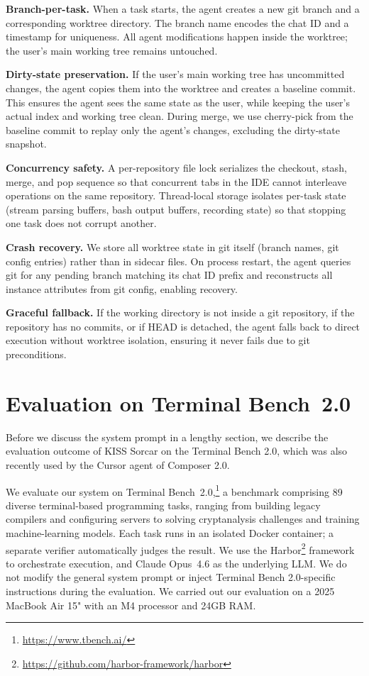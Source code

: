 \documentclass{article}
\begin{document}
\textbf{Branch-per-task.}  When a task starts, the agent creates a new git branch and a corresponding worktree directory.  The branch name encodes the chat ID and a timestamp for uniqueness.  All agent modifications happen inside the worktree; the user's main working tree remains untouched.

\textbf{Dirty-state preservation.}  If the user's main working tree has uncommitted changes, the agent copies them into the worktree and creates a baseline commit.  This ensures the agent sees the same state as the user, while keeping the user's actual index and working tree clean.  During merge, we use cherry-pick from the baseline commit to replay only the agent's changes, excluding the dirty-state snapshot.

\textbf{Concurrency safety.}  A per-repository file lock serializes the checkout, stash, merge, and pop sequence so that concurrent tabs in the IDE cannot interleave operations on the same repository. Thread-local storage isolates per-task state (stream parsing buffers, bash output buffers, recording state) so that stopping one task does not corrupt another.

\textbf{Crash recovery.}  We store all worktree state in git itself (branch names, git config entries) rather than in sidecar files.  On process restart, the agent queries git for any pending branch matching its chat ID prefix and reconstructs all instance attributes from git config, enabling recovery.

\textbf{Graceful fallback.}  If the working directory is not inside a git repository, if the repository has no commits, or if HEAD is detached, the agent falls back to direct execution without worktree isolation, ensuring it never fails due to git preconditions.


\section{Evaluation on Terminal Bench~2.0}
\label{sec:evaluation}

Before we discuss the system prompt in a lengthy section, we describe the evaluation outcome of KISS Sorcar on the Terminal Bench 2.0, which was also recently used by the Cursor agent of Composer 2.0.

We evaluate our system on Terminal Bench~2.0,\footnote{\url{https://www.tbench.ai/}} a benchmark comprising 89 diverse terminal-based programming tasks, ranging from building legacy compilers and configuring servers to solving cryptanalysis challenges and training machine-learning models.  Each task runs in an isolated Docker container; a separate verifier automatically judges the result.  We use the Harbor\footnote{\url{https://github.com/harbor-framework/harbor}} framework to orchestrate execution, and Claude Opus~4.6 as the underlying LLM.  We do not modify the general system prompt or inject Terminal Bench 2.0-specific instructions during the evaluation.  We carried out our evaluation on a 2025 MacBook Air 15" with an M4 processor and 24GB RAM.
\end{document}
